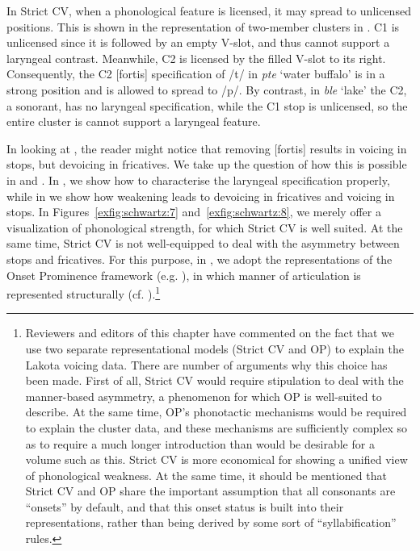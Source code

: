 \documentclass[output=paper]{langscibook}
\begin{document}
In Strict CV, when a phonological feature is licensed, it may spread to unlicensed positions. This is shown in the representation of two-member clusters in . C1 is unlicensed since it is followed by an empty V-slot, and thus cannot support a laryngeal contrast. Meanwhile, C2 is licensed by the filled V-slot to its right. Consequently, the C2 [fortis] specification of /t/ in \textit{pte} ‘water buffalo’ is in a strong position and is allowed to spread to /p/. By contrast, in \textit{ble} ‘lake’ the C2, a sonorant, has no laryngeal specification, while the C1 stop is unlicensed, so the entire cluster is cannot support a laryngeal feature.

In looking at , the reader might notice that removing [fortis] results in voicing in stops, but devoicing in fricatives. We take up the question of how this is possible in  and . In , we show how to characterise the laryngeal specification properly, while in  we show how weakening leads to devoicing in fricatives and voicing in stops. In Figures~\ref{exfig:schwartz:7} and~\ref{exfig:schwartz:8}, we merely offer a visualization of phonological strength, for which Strict CV is well suited. At the same time, Strict CV is not well-equipped to deal with the asymmetry between stops and fricatives. For this purpose, in , we adopt the representations of the Onset Prominence framework (e.g. \citealt{Schwartz2016}), in which manner of articulation is represented structurally (cf. \citealt{Steriade1993}).\footnote{Reviewers and editors of this chapter have commented on the fact that we use two separate representational models (Strict CV and OP) to explain the Lakota voicing data. There are number of arguments why this choice has been made. First of all, Strict CV would require stipulation to deal with the manner-based asymmetry, a phenomenon for which OP is well-suited to describe. At the same time, OP’s phonotactic mechanisms would be required to explain the cluster data, and these mechanisms are sufficiently complex so as to require a much longer introduction than would be desirable for a volume such as this. Strict CV is more economical for showing a unified view of phonological weakness. At the same time, it should be mentioned that Strict CV and OP share the important assumption that all consonants are “onsets” by default, and that this onset status is built into their representations, rather than being derived by some sort of “syllabification” rules.}
\end{document}
